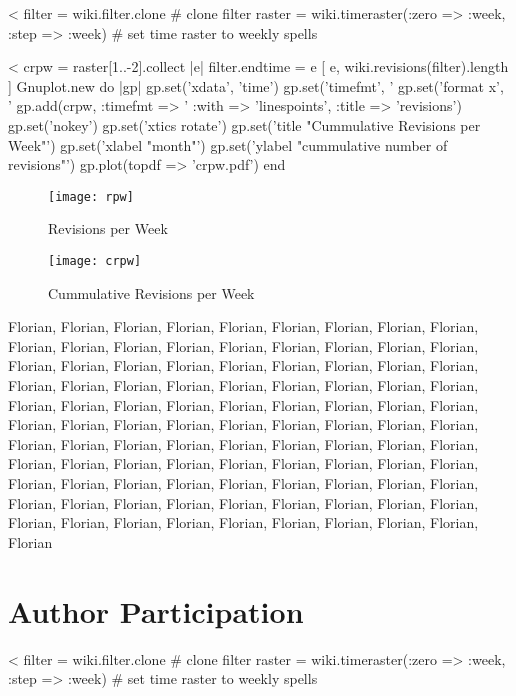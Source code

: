 \documentclass{scrartcl}
\begin{document}
<%
filter = wiki.filter.clone # clone filter
raster = wiki.timeraster(:zero => :week, :step => :week) # set time raster to weekly spells

<%
crpw = raster[1..-2].collect { |e| filter.endtime = e 
	[ e, wiki.revisions(filter).length ]
	}
Gnuplot.new do |gp|
	gp.set('xdata', 'time')
	gp.set('timefmt', '%
	gp.set('format x', '%
	gp.add(crpw, :timefmt => '%
		:with => 'linespoints', 
		:title => 'revisions')
	gp.set('nokey')
	gp.set('xtics rotate')
	gp.set('title "Cummulative Revisions per Week"')
	gp.set('xlabel "month"')
	gp.set('ylabel "cummulative number of revisions"')
	gp.plot(topdf => 'crpw.pdf')
end
\begin{figure}[htbp]
	\centering
	\texttt{[image: rpw]}
	\caption{Revisions per Week}
	\label{fig:revisions_per_week}
        \vfill

	\texttt{[image: crpw]}
	\caption{Cummulative Revisions per Week}
	\label{fig:cummulative_revisions_per_week}
\end{figure}

Florian, Florian, Florian, Florian, Florian, Florian, Florian, Florian, Florian, Florian, Florian, Florian, Florian, Florian, Florian, Florian, Florian, Florian, Florian, Florian, Florian, Florian, Florian, Florian, Florian, Florian, Florian, Florian, Florian, Florian, Florian, Florian, Florian, Florian, Florian, Florian, Florian, Florian, Florian, Florian, Florian, Florian, Florian, Florian, Florian, Florian, Florian, Florian, Florian, Florian, Florian, Florian, Florian, Florian, Florian, Florian, Florian, Florian, Florian, Florian, Florian, Florian, Florian, Florian, Florian, Florian, Florian, Florian, Florian, Florian, Florian, Florian, Florian, Florian, Florian, Florian, Florian, Florian, Florian, Florian, Florian, Florian, Florian, Florian, Florian, Florian, Florian, Florian, Florian, Florian, Florian, Florian, Florian, Florian, Florian, Florian, Florian, Florian, Florian, Florian


\section{Author Participation} %
\label{sec:author_participation}

<%
filter = wiki.filter.clone # clone filter
raster = wiki.timeraster(:zero => :week, :step => :week) # set time raster to weekly spells
\end{document}
